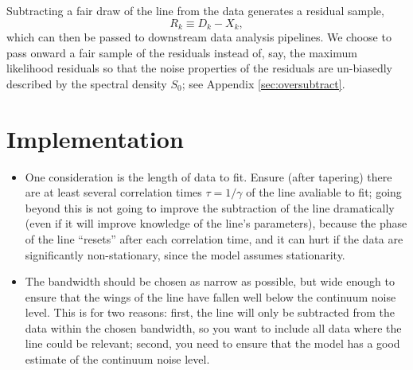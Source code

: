 \documentclass[modern]{aastex631}
\begin{document}
Subtracting a fair draw of the line from the data generates a residual sample, 
\begin{equation}
    R_k \equiv D_k - X_k,
\end{equation}
which can then be passed to downstream data analysis pipelines.  We choose to
pass onward a fair sample of the residuals instead of, say, the maximum
likelihood residuals so that the noise properties of the residuals are
un-biasedly described by the spectral density $S_0$; see Appendix
\ref{sec:oversubtract}.

\section{Implementation}

\begin{itemize}
    \item One consideration is the length of data to fit.  Ensure (after
    tapering) there are at least several correlation times $\tau = 1/\gamma$ of
    the line avaliable to fit; going beyond this is not going to improve the
    subtraction of the line dramatically (even if it will improve knowledge of
    the line's parameters), because the phase of the line ``resets'' after each
    correlation time, and it can hurt if the data are significantly
    non-stationary, since the model assumes stationarity.
    \item The bandwidth should be chosen as narrow as possible, but wide enough
    to ensure that the wings of the line have fallen well below the continuum noise
    level.  This is for two reasons: first, the line will only be subtracted from the data within the chosen bandwidth, so you want to include all data where the line could be relevant; second, you need to ensure that the model has a good estimate of the continuum noise level.
\end{itemize}
\end{document}

